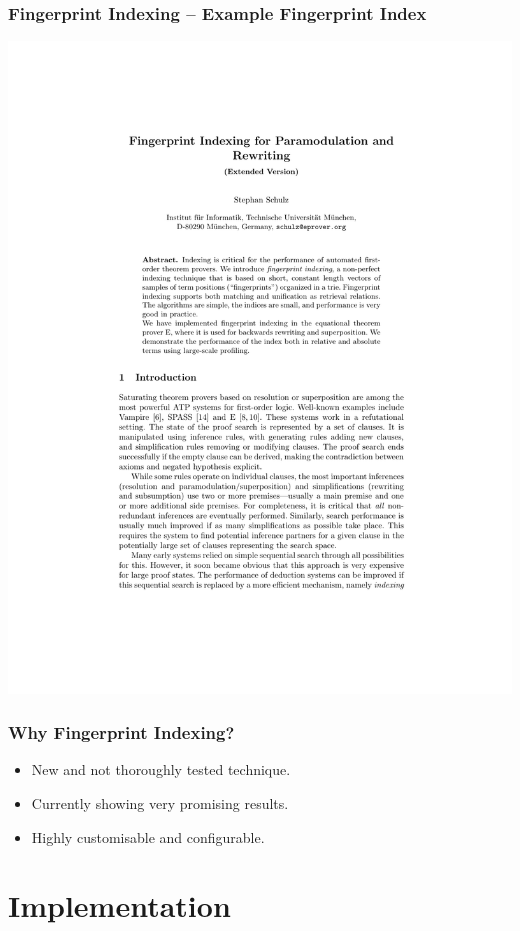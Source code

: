 \documentclass[10pt,xcolor={dvipsnames}]{beamer}
\begin{document}
\begin{NoHyper}
\begin{frame}
  \frametitle{Fingerprint Indexing -- Example Fingerprint Index}
  \includegraphics[page=7,scale=0.7,trim=4cm 13.5cm 5cm 4.5cm,clip]{schulz_fp-index_ext}
\end{frame}

\begin{frame}
  \frametitle{Why Fingerprint Indexing?}
  \begin{itemize}
  \item<1-> New and not thoroughly tested technique.
  \item<2-> Currently showing very promising results.
  \item<3-> Highly customisable and configurable.
  \end{itemize}
\end{frame}

\section{Implementation}


\end{NoHyper}
\end{document}
